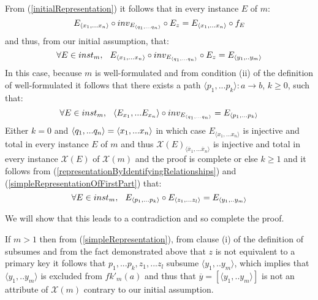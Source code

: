 \documentclass[10pt,a4paper]{article}
\newcommand{\genericmodel}{\mathcal{M}}
\renewcommand{\genericmodel}{{m}}
\newcommand{\fkp}[2] [\genericmodel]{fk'_{#1}(#2)}
\newcommand{\logtophys}{\mathcal{X}}
\newcommand{\phys}[1]{\overline{#1}}
\newcommand{\genericphysical}{\logtophys(\genericmodel)}
\newcommand{\ntuple}[1]{\tuple{#1_1,...#1_n}}
\newcommand {\qntuple}{\ensuremath{\ntuple{q}}}
\begin{document}
\noindent From (\ref{initialRepresentation}) it follows that in every instance $E$ of $\genericmodel$:  
\begin{equation*}
E_{\langle x_1,...x_n \rangle}\circ inv_{E_{\qntuple}} \circ E_{z}  = E_{\langle x_1,...x_n \rangle} \circ f_E 
\end{equation*}
\noindent and thus, from our initial assumption, that:
\begin{equation}
\label{representationByIdentifyingRelationships}
\ineveryinstance E_{\langle x_1,...x_n \rangle}\circ inv_{E_{\qntuple}} \circ E_{z} = E_{\langle y_1,..y_m \rangle} 
\end{equation}
\noindent In this case, because $\genericmodel$ is well-formulated and from condition (ii) of the definition of well-formulated it follows that there exists
a path $\langle p_1,...p_k \rangle:a \rightarrow b$, $k \geq 0$, such that:
\begin{equation}
\label{simpleRepresentationOfFirstPart}
\ineveryinstance \langle E_{x_1},...E_{x_n} \rangle \circ inv_{E_{\qntuple}} = E_{\langle p_1,...p_k \rangle}
\end{equation}
\noindent Either $k=0$ and $\qntuple = \langle x_1,...x_n \rangle$ in which case $E_{\langle x_1,...x_n \rangle}$ is
injective and total in every instance $E$ of $\genericmodel$ and thus $\logtophys(E)_{\langle \phys{x}_1,...\phys{x}_n \rangle}$ is
injective and total in every instance $\logtophys(E)$ of $\genericphysical$ and the proof is complete 
\noindent or else $k \geq 1$ and it follows from (\ref{representationByIdentifyingRelationships}) and (\ref{simpleRepresentationOfFirstPart}) that:
\begin{equation} 
\label{simpleRepresentation}
\ineveryinstance  E_{\langle p_1,...p_k \rangle} \circ E_{\langle z_1,...z_l \rangle} = E_{\langle y_1,..y_m \rangle} 
\end{equation}


We will show that this leads to a contradiction and so complete the proof. 


If $m >1$ then
 from  (\ref{simpleRepresentation}),
from clause (i) of the definition of subsumes and from the fact demonstrated above that $z$ is not equivalent to a primary key 
it follows that $p_1,...p_k,z_1,...z_l$ subsume $\langle y_1,..y_m \rangle$, 
which implies that $\langle y_1,..y_m \rangle$ is excluded from $\fkp{a}$ and thus that 
 $\phys{y}=\left[\langle y_1,..y_m \rangle\right]$ is not an attribute of $\genericphysical$ contrary to our 
initial assumption. 
\end{document}
